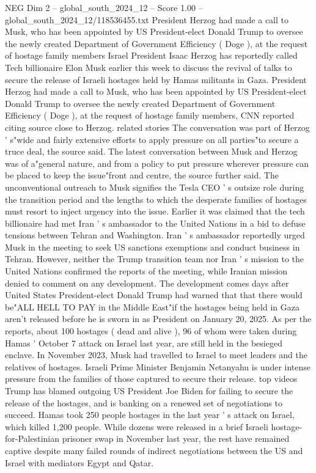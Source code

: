 \begin{textsample}{NEG Dim 2 – global\_south\_2024\_12 – Score 1.00 – global\_south\_2024\_12/118536455.txt}  \label{ex:f2_neg_380}
President Herzog had made a call to Musk, who has been appointed by US President-elect Donald Trump to oversee the newly created Department of Government Efficiency ( Doge ), at the request of hostage family members Israel President Isaac Herzog has reportedly called Tech billionaire Elon Musk earlier this week to discuss the revival of talks to secure the release of Israeli hostages held by Hamas militants in Gaza.
President Herzog had made a call to Musk, who has been appointed by US President-elect Donald Trump to oversee the newly created Department of Government Efficiency ( Doge ), at the request of hostage family members, CNN reported citing source close to Herzog. related stories The conversation was part of Herzog ' s"wide and fairly extensive efforts to apply pressure on all parties"to secure a truce deal, the source said.
The latest conversation between Musk and Herzog was of a"general nature, and from a policy to put pressure wherever pressure can be placed to keep the issue"front and centre, the source further said.
The unconventional outreach to Musk signifies the Tesla CEO ' s outsize role during the transition period and the lengths to which the desperate families of hostages must resort to inject urgency into the issue.
Earlier it was claimed that the tech billionaire had met Iran ' s ambassador to the United Nations in a bid to defuse tensions between Tehran and Washington.
Iran ' s ambassador reportedly urged Musk in the meeting to seek US sanctions exemptions and conduct business in Tehran.
However, neither the Trump transition team nor Iran ' s mission to the United Nations confirmed the reports of the meeting, while Iranian mission denied to comment on any development.
The development comes days after United States President-elect Donald Trump had warned that that there would be"ALL HELL TO PAY in the Middle East"if the hostages being held in Gaza aren't released before he is sworn in as President on January 20, 2025.
As per the reports, about 100 hostages ( dead and alive ), 96 of whom were taken during Hamas ' October 7 attack on Israel last year, are still held in the besieged enclave.
In November 2023, Musk had travelled to Israel to meet leaders and the relatives of hostages.
Israeli Prime Minister Benjamin Netanyahu is under intense pressure from the families of those captured to secure their release. top videos Trump has blamed outgoing US President Joe Biden for failing to secure the release of the hostages, and is banking on a renewed set of negotiations to succeed.
Hamas took 250 people hostages in the last year ' s attack on Israel, which killed 1,200 people.
While dozens were released in a brief Israeli hostage-for-Palestinian prisoner swap in November last year, the rest have remained captive despite many failed rounds of indirect negotiations between the US and Israel with mediators Egypt and Qatar.

\end{textsample}
